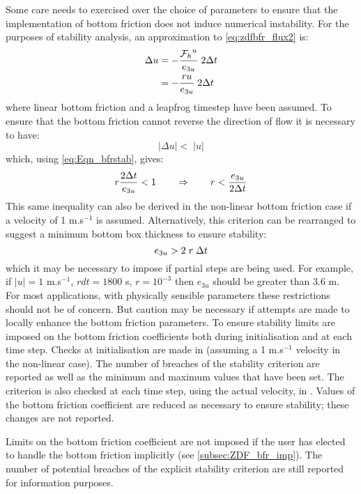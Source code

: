 \documentclass[../main/NEMO_manual]{subfiles}
\begin{document}
Some care needs to exercised over the choice of parameters to ensure that the implementation of
bottom friction does not induce numerical instability.
For the purposes of stability analysis, an approximation to \autoref{eq:zdfbfr_flux2} is:
\begin{equation}
  \label{eq:Eqn_bfrstab}
  \begin{split}
    \Delta u &= -\frac{{{\cal F}_h}^u}{e_{3u}}\;2 \Delta t    \\
    &= -\frac{ru}{e_{3u}}\;2\Delta t\\
  \end{split}
\end{equation}
\noindent where linear bottom friction and a leapfrog timestep have been assumed.
To ensure that the bottom friction cannot reverse the direction of flow it is necessary to have:
\[
  |\Delta u| < \;|u| 
\]
\noindent which, using \autoref{eq:Eqn_bfrstab}, gives:
\[
  r\frac{2\Delta t}{e_{3u}} < 1 \qquad  \Rightarrow \qquad r < \frac{e_{3u}}{2\Delta t}\\
\]
This same inequality can also be derived in the non-linear bottom friction case if
a velocity of 1 m.s$^{-1}$ is assumed.
Alternatively, this criterion can be rearranged to suggest a minimum bottom box thickness to ensure stability:
\[
  e_{3u} > 2\;r\;\Delta t
\]
\noindent which it may be necessary to impose if partial steps are being used.
For example, if $|u| = 1$ m.s$^{-1}$, $rdt = 1800$ s, $r = 10^{-3}$ then $e_{3u}$ should be greater than 3.6 m.
For most applications, with physically sensible parameters these restrictions should not be of concern.
But caution may be necessary if attempts are made to locally enhance the bottom friction parameters. 
To ensure stability limits are imposed on the bottom friction coefficients both
during initialisation and at each time step.
Checks at initialisation are made in  (assuming a 1 m.s$^{-1}$ velocity in the non-linear case).
The number of breaches of the stability criterion are reported as well as
the minimum and maximum values that have been set.
The criterion is also checked at each time step, using the actual velocity, in .
Values of the bottom friction coefficient are reduced as necessary to ensure stability;
these changes are not reported.

Limits on the bottom friction coefficient are not imposed if the user has elected to
handle the bottom friction implicitly (see \autoref{subsec:ZDF_bfr_imp}).
The number of potential breaches of the explicit stability criterion are still reported for information purposes.
\end{document}
